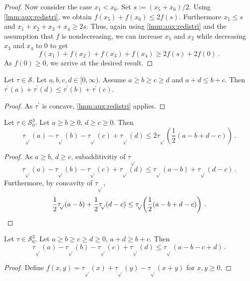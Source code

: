\documentclass{article}
\newcommand{\lb}{\left(} %
\newcommand{\rb}{\right)} %
\newcommand{\br}[1]{\lb #1 \rb} %
\newcommand{\brOf}[1]{\!\br{#1}} %
\newcommand*{\mc}[1]{\mathcal{#1}}
\newcommand{\Rp}{[0, \infty)} %
\newcommand{\pr}{^\prime}
\newcommand{\equationFullstop}{\, .}
\newcommand{\eqfs}{\equationFullstop}
\newcommand{\tran}{\tau}
\newcommand{\trans}{\tran_{\!\sqrt{}}}
\newcommand{\dtran}{\tran\pr}
\newcommand{\setcc}{\mc S}
\newcommand{\setccod}[1]{\mc S_0^{#1}}
\begin{document}
\begin{appendix}
\begin{proof}
	Now consider the case $x_1 < x_6$. Set $s := (x_5+x_6)/2$. Using \cref{lmm:aux:redistri}, we obtain $f(x_5) + f(x_6) \leq 2f(s)$. Furthermore $x_1 \leq s$ and $x_1 + x_2 + x_3 + x_4 \geq 2s$. Thus, again using  \cref{lmm:aux:redistri} and the assumption that $f$ is nondecreasing, we can increase $x_1$ and $x_2$ while decreasing $x_3$ and $x_4$ to $0$ to get
	\begin{equation}
		f(x_1) + f(x_2) + f(x_3) + f(x_4) \geq 2f(s) + 2f(0)
		\eqfs
	\end{equation}
	As $f(0)\geq 0$, we arrive at the desired result.
\end{proof}
%
%
\begin{lemma}\label{lmm:aux:extreme}
	Let $\tran\in\setcc$.
	Let $a,b,c,d\in\Rp$.
	Assume $a \geq b \geq c \geq d$ and $a+d \leq b+c$. Then $\dtran(a) + \dtran(d) \leq \dtran(b) + \dtran(c)$.
\end{lemma}
%
\begin{proof}
	As $\dtran$ is concave, \cref{lmm:aux:redistri} applies.
\end{proof}
%
%
%
%
\begin{lemma}\label{lmm:f1}
	Let $\tran\in\setccod{3}$.
	Let $a\geq b\geq 0 $, $d \geq c \geq 0$.
	Then
	\begin{equation*}
		\trans(a) - \trans(b) - \trans(c) + \trans(d) \leq 
		2 \trans\brOf{\frac12 (a-b+d-c)}
		\eqfs
	\end{equation*}
\end{lemma}
%
\begin{proof}
	As $a\geq b$, $d\geq c$, subadditivitiy of $\trans$
	\begin{equation*}
		\trans(a) - \trans(b) - \trans(c) + \trans(d) \leq \trans(a-b) + \trans(d-c) \eqfs
	\end{equation*}
	Furthermore, by concavity of $\trans$,
	\begin{equation*}
		\frac12 \trans(a-b) + \frac12 \trans(d-c)
		\leq
		\trans\brOf{\frac12 (a-b+d-c)}
		\eqfs
		\qedhere
	\end{equation*}
\end{proof}
%
\begin{lemma}\label{lmm:f2}
	Let $\tran\in\setccod{3}$. Let $a\geq b\geq c \geq d\geq 0$, $a+d\geq b+c$.
	Then
	\begin{equation*}
		\trans(a) - \trans(b) - \trans(c) + \trans(d) \leq \trans(a-b-c+d)
		\eqfs
	\end{equation*}
\end{lemma}
%
\begin{proof}
	Define $f(x,y) = \trans(x) + \trans(y) - \trans(x + y)$ for $x,y\geq0$.

\end{proof}
\end{appendix}
\end{document}
